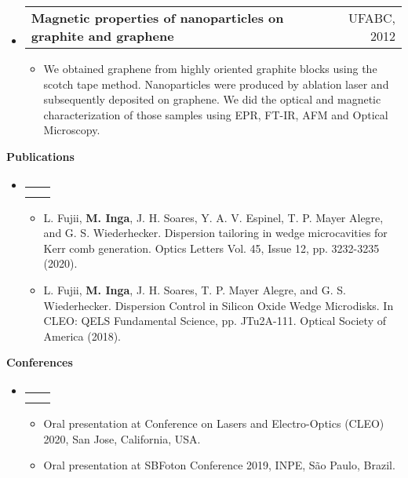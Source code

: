 \documentclass[letterpaper,12pt]{article}[leftmargin=*]
\makeatletter
\def \entryspacing {-0pt}
\renewcommand{\section}[2]{\vspace{5pt}
  \colorbox{secondary}{\color{white}\raggedbottom\normalsize\textbf{{#1}{\hspace{7pt}#2}}}
}
\newcommand{\resumeEntryStart}{\begin{itemize}[leftmargin=2.5mm]}
\newcommand{\resumeEntryEnd}{\end{itemize}\vspace{\entryspacing}}
\newcommand{\resumeItemListStart}{\begin{itemize}[leftmargin=4.5mm]}
\newcommand{\resumeItemListEnd}{\end{itemize}}
\newcommand{\resumeItem}[1]{
  \item\small{
    {#1 \vspace{-2pt}}
  }
}
\newcommand{\resumeEntryTSDL}[4]{
  \vspace{-1pt}\item[]
    \begin{tabularx}{0.97\textwidth}{X@{\hspace{60pt}}r}
      \textbf{\color{primary}#1} & {\firabook\color{accent}\small#2} \\
      \textit{\color{accent}\small#3} & \textit{\color{accent}\small#4} \\
    \end{tabularx}\vspace{-6pt}
}
\newcommand{\resumeEntryTD}[2]{
  \vspace{-1pt}\item[]
    \begin{tabularx}{0.97\textwidth}{X@{\hspace{60pt}}r}
      \textbf{\color{primary}#1} & {\firabook\color{accent}\small#2} \\
    \end{tabularx}\vspace{-6pt}
}
\makeatother
\begin{document}
\vspace{-0.5cm}

\resumeEntryStart
\resumeEntryTD
{Magnetic properties of \ce{CuO2} nanoparticles on graphite and graphene}{UFABC, 2012}
\resumeItemListStart
\resumeItem {We obtained graphene from highly oriented graphite blocks using the scotch tape method. Nanoparticles were produced by ablation laser and subsequently deposited on graphene. We did the optical and magnetic characterization of those samples using EPR, FT-IR, AFM and Optical Microscopy.}

\resumeItemListEnd
\resumeEntryEnd

\vspace{-0.3cm}

\section{\faBarChart}{Publications}
\vspace{-1.3cm}

\resumeEntryStart
\resumeEntryTSDL
{}{}
{}{}
\resumeItemListStart
\resumeItem {L. Fujii, \textbf{M. Inga}, J. H. Soares, Y. A. V. Espinel, T. P. Mayer Alegre, and G. S. Wiederhecker. Dispersion tailoring in wedge microcavities for Kerr comb generation. Optics Letters Vol. 45, Issue 12, pp. 3232-3235 (2020). \href{https://www.osapublishing.org/ol/abstract.cfm?uri=ol-45-12-3232}{\faExternalLink}}
\resumeItem{L. Fujii, \textbf{M. Inga}, J. H. Soares, T. P. Mayer Alegre, and G. S. Wiederhecker. Dispersion Control in Silicon Oxide Wedge Microdisks. In CLEO: QELS Fundamental Science, pp. JTu2A-111. Optical Society of America (2018). \href{https://www.osapublishing.org/abstract.cfm?uri=CLEO_SI-2018-JTu2A.111}{\faExternalLink}}
\resumeItemListEnd
\resumeEntryEnd

\vspace{-0.3cm}


\section{\faGroup}{Conferences}
\vspace{-1.4cm}

\resumeEntryStart
\resumeEntryTSDL
{}{}
{}{}
\resumeItemListStart
\resumeItem {Oral presentation at Conference on Lasers and Electro-Optics (CLEO) 2020, San Jose, California, USA. \href{https://www.cleoconference.org/home/schedule/}{\faExternalLink}}
\resumeItem{Oral presentation at SBFoton Conference 2019, INPE, São Paulo, Brazil. \href{https://www.sbfoton.org.br/tech_sessions/}{\faExternalLink}}
\resumeItemListEnd
\resumeEntryEnd

\vspace{-0.3cm}
\end{document}
